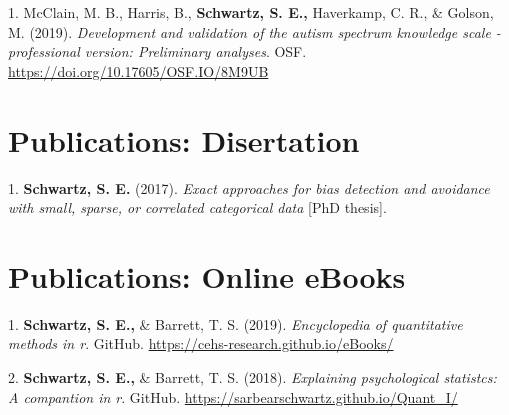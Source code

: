 \documentclass[11pt,a4paper,]{moderncv}
\newlength{\cslhangindent}
\newenvironment{CSLReferences}[2] %
 {\begin{list}{}{%
  \setlength{\itemindent}{0pt}
  \setlength{\leftmargin}{0pt}
  \setlength{\parsep}{0pt}
  \ifodd #1
   \setlength{\leftmargin}{\cslhangindent}
   \setlength{\itemindent}{-1\cslhangindent}
  \fi
  \setlength{\itemsep}{#2\baselineskip}}}
 {\end{list}}
\begin{document}
\begingroup
\setlength{\parindent}{-0.5in}
\setlength{\leftskip}{0.5in}

\label{refs-b25813ee68daa52f8de006600cdc5378}
\begin{CSLReferences}{1}{0}
1. McClain, M. B., Harris, B., \textbf{Schwartz, S. E.,} Haverkamp, C.
R., \& Golson, M. (2019). \emph{Development and validation of the autism
spectrum knowledge scale - professional version: Preliminary analyses}.
OSF. \url{https://doi.org/10.17605/OSF.IO/8M9UB}

\end{CSLReferences}

\endgroup

\vspace{7mm}

\section{Publications: Disertation}\label{publications-disertation}

\begingroup
\setlength{\parindent}{-0.5in}
\setlength{\leftskip}{0.5in}

\label{refs-8b1281a69e493e0db82cbff31135902c}
\begin{CSLReferences}{1}{0}
1. \textbf{Schwartz, S. E.} (2017). \emph{Exact approaches for bias
detection and avoidance with small, sparse, or correlated categorical
data} {[}PhD thesis{]}.

\end{CSLReferences}

\endgroup

\vspace{7mm}

\section{Publications: Online eBooks}\label{publications-online-ebooks}

\begingroup
\setlength{\parindent}{-0.5in}
\setlength{\leftskip}{0.5in}

\label{refs-cf745996f10a565a9a4ac9447acf67ce}
\begin{CSLReferences}{1}{0}
1. \textbf{Schwartz, S. E.,} \& Barrett, T. S. (2019).
\emph{Encyclopedia of quantitative methods in r}. GitHub.
\url{https://cehs-research.github.io/eBooks/}

2. \textbf{Schwartz, S. E.,} \& Barrett, T. S. (2018). \emph{Explaining
psychological statistcs: A compantion in r}. GitHub.
\url{https://sarbearschwartz.github.io/Quant_I/}

\end{CSLReferences}
\end{document}
